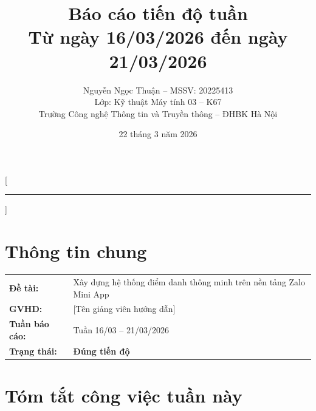 \documentclass{article}
\title{Báo cáo tiến độ tuần\\[0.3em] \large Từ ngày 16/03/2026 đến ngày 21/03/2026}
\author{Nguyễn Ngọc Thuận -- MSSV: 20225413\\[0.2em] \normalsize Lớp: Kỹ thuật Máy tính 03 -- K67\\[0.1em] \normalsize Trường Công nghệ Thông tin và Truyền thông -- ĐHBK Hà Nội}
\date{22 tháng 3 năm 2026}
\begin{document}
\maketitle



\pagestyle{fancy}
\fancyhf{}
\fancyfoot[C]{\small\thepage}
\renewcommand{\headrulewidth}{0.4pt}

[\vspace{-0.3em}\textcolor{hustred}{\rule{\textwidth}{0.8pt}}]

\section{Thông tin chung}

\begin{tabularx}{\textwidth}{@{}l X@{}}
\textbf{Đề tài:} & Xây dựng hệ thống điểm danh thông minh trên nền tảng Zalo Mini App \\
\textbf{GVHD:} & [Tên giảng viên hướng dẫn] \\
\textbf{Tuần báo cáo:} & Tuần 16/03 -- 21/03/2026 \\
\textbf{Trạng thái:} & \textcolor{statusgreen}{\textbf{Đúng tiến độ}} \\
\end{tabularx}

\section{Tóm tắt công việc tuần này}
\end{document}
